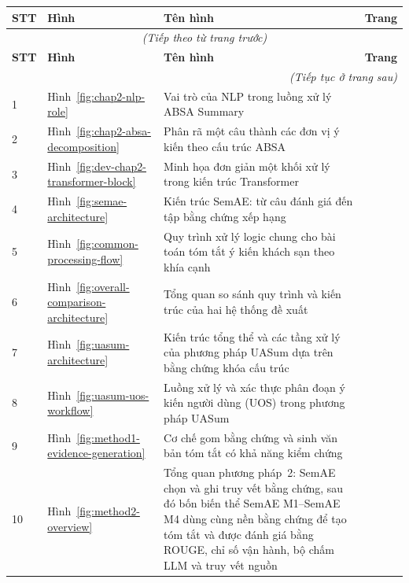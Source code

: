 \documentclass[12pt,a4paper]{report}
\begin{document}
\renewcommand{\arraystretch}{1.18}
\begin{longtable}{|p{}|p{}|p{}|p{}|}
\hline
\textbf{STT} & \textbf{Hình} & \textbf{Tên hình} & \textbf{Trang} \\ \hline
\endfirsthead
\multicolumn{4}{|c|}{\textit{(Tiếp theo từ trang trước)}} \\ \hline
\textbf{STT} & \textbf{Hình} & \textbf{Tên hình} & \textbf{Trang} \\ \hline
\endhead
\multicolumn{4}{|r|}{\textit{(Tiếp tục ở trang sau)}} \\ \hline
\endfoot
\hline
\endlastfoot

1 & Hình~\ref{fig:chap2-nlp-role} & Vai trò của NLP trong luồng xử lý ABSA Summary & \pageref{fig:chap2-nlp-role} \\ \hline
2 & Hình~\ref{fig:chap2-absa-decomposition} & Phân rã một câu thành các đơn vị ý kiến theo cấu trúc ABSA & \pageref{fig:chap2-absa-decomposition} \\ \hline
3 & Hình~\ref{fig:dev-chap2-transformer-block} & Minh họa đơn giản một khối xử lý trong kiến trúc Transformer & \pageref{fig:dev-chap2-transformer-block} \\ \hline
4 & Hình~\ref{fig:semae-architecture} & Kiến trúc SemAE: từ câu đánh giá đến tập bằng chứng xếp hạng \cite{angelidis2021extractive} & \pageref{fig:semae-architecture} \\ \hline
5 & Hình~\ref{fig:common-processing-flow} & Quy trình xử lý logic chung cho bài toán tóm tắt ý kiến khách sạn theo khía cạnh & \pageref{fig:common-processing-flow} \\ \hline
6 & Hình~\ref{fig:overall-comparison-architecture} & Tổng quan so sánh quy trình và kiến trúc của hai hệ thống đề xuất & \pageref{fig:overall-comparison-architecture} \\ \hline
7 & Hình~\ref{fig:uasum-architecture} & Kiến trúc tổng thể và các tầng xử lý của phương pháp UASum dựa trên bằng chứng khóa cấu trúc & \pageref{fig:uasum-architecture} \\ \hline
8 & Hình~\ref{fig:uasum-uos-workflow} & Luồng xử lý và xác thực phân đoạn ý kiến người dùng (UOS) trong phương pháp UASum & \pageref{fig:uasum-uos-workflow} \\ \hline
9 & Hình~\ref{fig:method1-evidence-generation} & Cơ chế gom bằng chứng và sinh văn bản tóm tắt có khả năng kiểm chứng & \pageref{fig:method1-evidence-generation} \\ \hline
10 & Hình~\ref{fig:method2-overview} & Tổng quan phương pháp~2: SemAE chọn và ghi truy vết bằng chứng, sau đó bốn biến thể SemAE M1--SemAE M4 dùng cùng nền bằng chứng để tạo tóm tắt và được đánh giá bằng ROUGE, chỉ số vận hành, bộ chấm LLM và truy vết nguồn & \pageref{fig:method2-overview} \\ \hline

\end{longtable}
\end{document}
